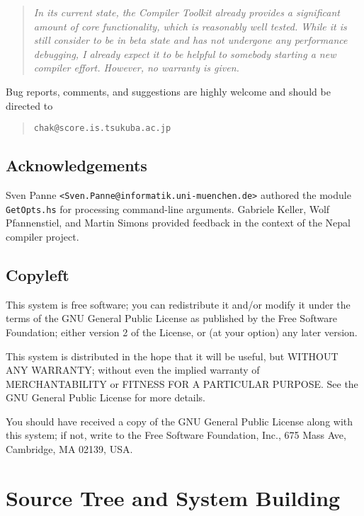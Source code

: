 \documentclass{report}
\newcommand{\code}[1]{\texttt{#1}}
\begin{document}
\begin{quote}\itshape
  In its current state, the Compiler Toolkit already provides a significant
  amount of core functionality, which is reasonably well tested.  While it is
  still consider to be in beta state and has not undergone any performance
  debugging, I already expect it to be helpful to somebody starting a new
  compiler effort.  However, no warranty is given.
\end{quote}

Bug reports, comments, and suggestions are highly welcome and should be
directed to 
%
\begin{quote}
  \code{chak@score.is.tsukuba.ac.jp}
\end{quote}


\section{Acknowledgements}

Sven Panne \code{<Sven.Panne@informatik.uni-muenchen.de>} authored the module
\code{GetOpts.hs} for processing command-line arguments.  Gabriele Keller,
Wolf Pfannenstiel, and Martin Simons provided feedback in the context of the
Nepal compiler project.


\section{Copyleft}

This system is free software; you can redistribute it and/or modify
it under the terms of the GNU General Public License as published by
the Free Software Foundation; either version 2 of the License, or
(at your option) any later version.

This system is distributed in the hope that it will be useful,
but WITHOUT ANY WARRANTY; without even the implied warranty of
MERCHANTABILITY or FITNESS FOR A PARTICULAR PURPOSE.  See the
GNU General Public License for more details.

You should have received a copy of the GNU General Public License
along with this system; if not, write to the Free Software
Foundation, Inc., 675 Mass Ave, Cambridge, MA 02139, USA.


\chapter{Source Tree and System Building}
\label{sec:source}
\end{document}
